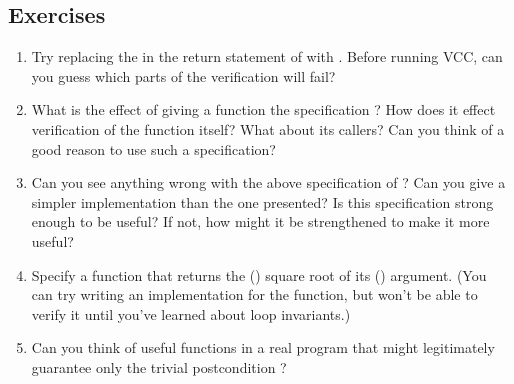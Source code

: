 \subsection*{Exercises}
\begin{enumerate}
\item
Try replacing the \vcc{<} in the return statement of  with
\vcc{>}. Before running VCC, can you guess which parts of the
verification will fail?

\item
What is the effect of giving a function the specification
? How does it effect verification of
the function itself? What about its callers? Can you think of a good 
reason to use such a specification?


\item
Can you see anything wrong with the above specification of ?
Can you give a simpler implementation than the one presented? Is this 
specification strong enough to be useful? If not, how might it be
strengthened to make it more useful?

\item
Specify a function that returns the () square root of its ()
argument. (You can try writing an implementation for the function, but
won't be able to verify it until you've learned about loop
invariants.)

\item
Can you think of useful functions in a real program that might
legitimately guarantee only the trivial postcondition ?
\end{enumerate}

